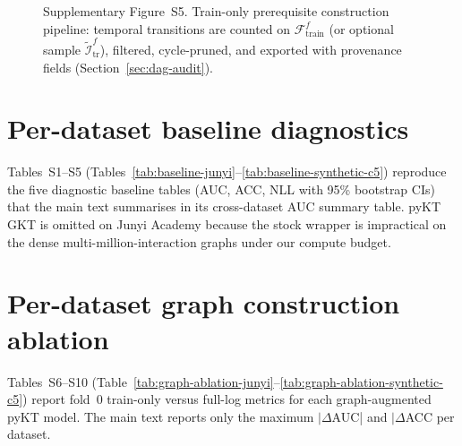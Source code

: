\documentclass[preprint,11pt]{elsarticle}
\begin{document}
\begin{figure}[!t]
\centering
\caption{Supplementary Figure~S5. Train-only prerequisite construction
pipeline: temporal transitions are counted on $\mathcal{F}^f_{\text{train}}$
(or optional sample $\tilde{\mathcal{I}}^f_{\text{tr}}$), filtered,
cycle-pruned, and exported with provenance fields (Section~\ref{sec:dag-audit}).}
\label{fig:kc-construction}
\end{figure}

\section{Per-dataset baseline diagnostics}
\label{sec:supp-baseline}
Tables~S1--S5 (Tables~\ref{tab:baseline-junyi}--\ref{tab:baseline-synthetic-c5})
reproduce the five diagnostic baseline tables (AUC, ACC, NLL with 95\% bootstrap
CIs) that the main text summarises in its cross-dataset AUC summary table.
pyKT GKT is omitted on Junyi Academy because the stock wrapper is impractical on
the dense multi-million-interaction graphs under our compute budget.



\section{Per-dataset graph construction ablation}
\label{sec:supp-ablation}
Tables~S6--S10 (Table~\ref{tab:graph-ablation-junyi}--\ref{tab:graph-ablation-synthetic-c5})
report fold~0 train-only versus full-log metrics for each graph-augmented pyKT
model. The main text reports only the maximum $|\Delta$AUC| and
$|\Delta$ACC per dataset.
\end{document}
